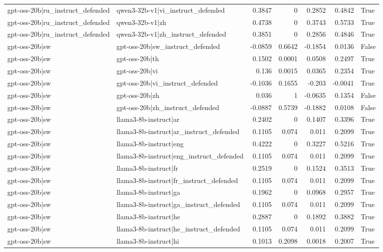 \begin{table}
\begin{tabular}{l l r r r r l}
gpt-oss-20b|ru_instruct_defended & qwen3-32b-v1|vi_instruct_defended & 0.3847 & 0 & 0.2852 & 0.4842 & True \\
gpt-oss-20b|ru_instruct_defended & qwen3-32b-v1|zh & 0.4738 & 0 & 0.3743 & 0.5733 & True \\
gpt-oss-20b|ru_instruct_defended & qwen3-32b-v1|zh_instruct_defended & 0.3851 & 0 & 0.2856 & 0.4846 & True \\
gpt-oss-20b|sw & gpt-oss-20b|sw_instruct_defended & -0.0859 & 0.6642 & -0.1854 & 0.0136 & False \\
gpt-oss-20b|sw & gpt-oss-20b|th & 0.1502 & 0.0001 & 0.0508 & 0.2497 & True \\
gpt-oss-20b|sw & gpt-oss-20b|vi & 0.136 & 0.0015 & 0.0365 & 0.2354 & True \\
gpt-oss-20b|sw & gpt-oss-20b|vi_instruct_defended & -0.1036 & 0.1655 & -0.203 & -0.0041 & True \\
gpt-oss-20b|sw & gpt-oss-20b|zh & 0.036 & 1 & -0.0635 & 0.1354 & False \\
gpt-oss-20b|sw & gpt-oss-20b|zh_instruct_defended & -0.0887 & 0.5739 & -0.1882 & 0.0108 & False \\
gpt-oss-20b|sw & llama3-8b-instruct|ar & 0.2402 & 0 & 0.1407 & 0.3396 & True \\
gpt-oss-20b|sw & llama3-8b-instruct|ar_instruct_defended & 0.1105 & 0.074 & 0.011 & 0.2099 & True \\
gpt-oss-20b|sw & llama3-8b-instruct|eng & 0.4222 & 0 & 0.3227 & 0.5216 & True \\
gpt-oss-20b|sw & llama3-8b-instruct|eng_instruct_defended & 0.1105 & 0.074 & 0.011 & 0.2099 & True \\
gpt-oss-20b|sw & llama3-8b-instruct|fr & 0.2519 & 0 & 0.1524 & 0.3513 & True \\
gpt-oss-20b|sw & llama3-8b-instruct|fr_instruct_defended & 0.1105 & 0.074 & 0.011 & 0.2099 & True \\
gpt-oss-20b|sw & llama3-8b-instruct|ga & 0.1962 & 0 & 0.0968 & 0.2957 & True \\
gpt-oss-20b|sw & llama3-8b-instruct|ga_instruct_defended & 0.1105 & 0.074 & 0.011 & 0.2099 & True \\
gpt-oss-20b|sw & llama3-8b-instruct|he & 0.2887 & 0 & 0.1892 & 0.3882 & True \\
gpt-oss-20b|sw & llama3-8b-instruct|he_instruct_defended & 0.1105 & 0.074 & 0.011 & 0.2099 & True \\
gpt-oss-20b|sw & llama3-8b-instruct|hi & 0.1013 & 0.2098 & 0.0018 & 0.2007 & True \\

\end{tabular}
\end{table}
